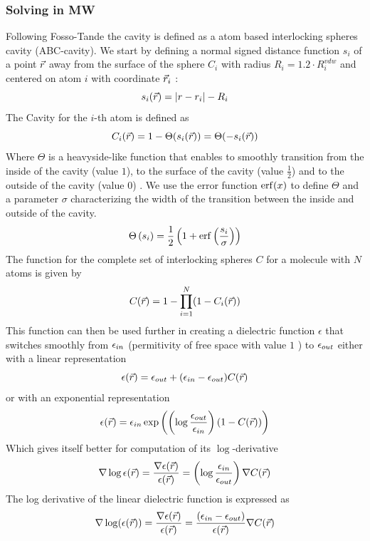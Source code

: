\documentclass[../master_thesis.tex]{subfiles}
\begin{document}
\subsubsection{Solving in \ac{MW}}\label{solmw}
Following Fosso-Tande \cite{FossoTande:2013ka} the cavity is defined as a atom
based interlocking spheres cavity (ABC-cavity). We start by defining a normal
signed distance function $s_i$ of a point $\vec{r}$ away from the surface of the
sphere $C_i$ with radius $R_i = 1.2\cdot R^{vdw}_i$ and centered on atom $i$ with
coordinate $\vec{r}_i$ \cite{FossoTande:2013ka}:
\begin{equation}
  s_i(\vec{r}) = \abs{r -r_i} - R_i
\end{equation}
The Cavity for the $i$-th atom is defined as
\begin{equation}
  C_i(\vec{r}) = 1 - \Theta(s_i(\vec{r})) =\Theta(-s_i(\vec{r}))
\end{equation}
Where $\Theta$ is a heavyside-like function that enables to smoothly transition
from the inside of the cavity (value $1$), to the surface of the cavity (value
$\frac{1}{2}$) and to the outside of the cavity (value $0$)
\cite{Sorland, FossoTande:2013ka}. We use the error function $\erf(x)$ to define
$\Theta$ and a parameter $\sigma$ characterizing the width of the transition
between the inside and outside of the cavity.
\begin{equation}
  \Theta\left(s_i\right) = \frac{1}{2}\left(1 + \erf\left(\frac{s_i}
  {\sigma}\right)\right)
\end{equation}
The function for the complete set of interlocking spheres $C$ for a molecule
with $N$ atoms is given by
\begin{equation}
  C(\vec{r}) = 1 - \prod_{i=1}^N(1 - C_i(\vec{r}))
\end{equation}
This function can then be used further in creating a dielectric function
$\epsilon$ that switches smoothly from $\epsilon_{in}$ (permitivity of free space
with value $1$ \cite{FossoTande:2013ka}) to $\epsilon_{out}$ either with a linear
representation
\begin{equation}\label{eq:dielfuncexp}
  \epsilon(\vec{r}) = \epsilon_{out}  + (\epsilon_{in} - \epsilon_{out})C(\vec{r})
\end{equation}
or with an exponential representation
\begin{equation}\label{eq:dielfunclin}
  \epsilon(\vec{r}) =\epsilon_{in}\exp\left( \left(\log\frac{\epsilon_{out}}{\epsilon_{in}} \right)
  (1 - C(\vec{r})) \right)
\end{equation}
Which gives itself better for computation of its $\log$-derivative
\cite{FossoTande:2013ka}
\begin{equation}\label{eq:logderepsexp}
  \nabla\log\epsilon(\vec{r}) = \frac{\nabla\epsilon(\vec{r})}{\epsilon(\vec{r})}
   = \left(\log\frac{\epsilon_{in}}{\epsilon_{out}} \right)\nabla C(\vec{r})
\end{equation}
The log derivative of the linear dielectric function is expressed as
\begin{equation}\label{eq:logderepslin}
  \nabla \log(\epsilon (\vec{r})) = \frac{\nabla\epsilon(\vec{r})}{\epsilon(\vec{r})}
  = \frac{(\epsilon_{in} - \epsilon_{out})}{\epsilon(\vec{r})}\nabla C(\vec{r})
\end{equation}
\end{document}
